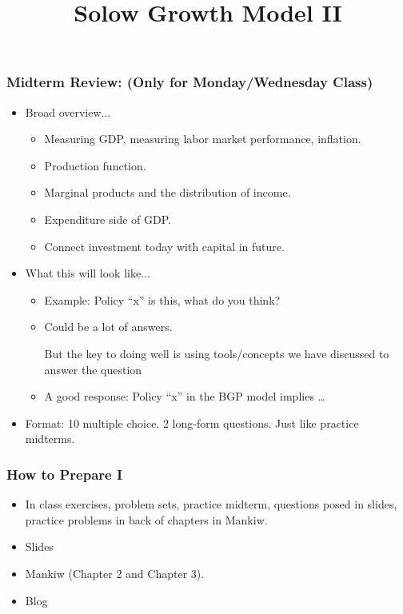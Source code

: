 \documentclass[9pt]{beamer}
\title[NYU Stern] %
{\huge Solow Growth Model II}
\author[Michael Waugh] %
{\bf{\Large}}%
\date[] %
\begin{document}



\begin{frame}[t]
\frametitle{Midterm Review: (Only for Monday/Wednesday Class)}
\begin{itemize}
\item Broad overview...
\begin{itemize}
\medskip
\item Measuring GDP, measuring labor market performance, inflation.
\medskip
\item Production function.
\medskip
\item Marginal products and the distribution of income.
\medskip
\item Expenditure side of GDP.
\medskip
\item Connect investment today with capital in future.
\end{itemize}
\bigskip
\item What this will look like...
\begin{itemize}
\medskip
\item Example: Policy ``x'' is this, what do you think?
\medskip
\item Could be a lot of answers. \begin{alertenv}{But the key to doing well is using tools/concepts we have discussed to answer the question}\end{alertenv}
\medskip
\item A good response: Policy ``x'' in the BGP model implies \ldots
\end{itemize}
\medskip
\item Format: 10 multiple choice. 2 long-form questions. Just like practice midterms.
\end{itemize}
\bigskip
\end{frame}



\begin{frame}[t]
\frametitle{How to Prepare I}
\begin{itemize}
\item In class exercises, problem sets, practice midterm, questions posed in slides, practice problems in back of chapters in Mankiw.
\medskip
\item Slides
\medskip
\item Mankiw (Chapter 2 and Chapter 3).
\medskip
\item Blog
\end{itemize}
\end{frame}
\end{document}
